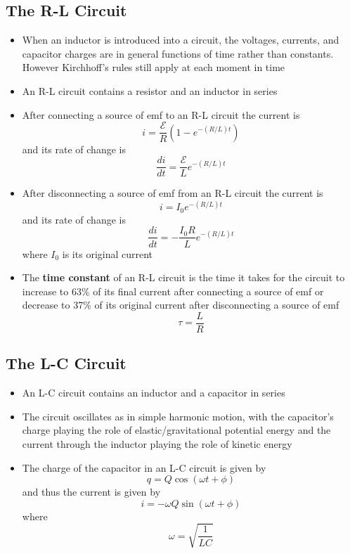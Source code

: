 \documentclass{article}
\begin{document}
\subsection{The R-L Circuit}

\begin{itemize}
  \item When an inductor is introduced into a circuit, the voltages, currents, and capacitor charges are in general functions of time rather than constants. However Kirchhoff's rules still apply at each moment in time

  \item An R-L circuit contains a resistor and an inductor in series

  \item After connecting a source of emf to an R-L circuit the current is \[i = \frac{\mathcal{E}}{R} (1 - e^{-(R / L) t})\] and its rate of change is \[\frac{di}{dt} = \frac{\mathcal{E}}{L} e^{-(R / L) t}\]

  \item After disconnecting a source of emf from an R-L circuit the current is \[i = I_0 e^{-(R / L) t}\] and its rate of change is \[\frac{di}{dt} = -\frac{I_0 R}{L} e^{-(R / L) t}\] where $I_0$ is its original current

  \item The \textbf{time constant} of an R-L circuit is the time it takes for the circuit to increase to 63\% of its final current after connecting a source of emf or decrease to 37\% of its original current after disconnecting a source of emf \[\tau = \frac{L}{R}\]
\end{itemize}

\subsection{The L-C Circuit}

\begin{itemize}
  \item An L-C circuit contains an inductor and a capacitor in series

  \item The circuit oscillates as in simple harmonic motion, with the capacitor's charge playing the role of elastic/gravitational potential energy and the current through the inductor playing the role of kinetic energy

\item The charge of the capacitor in an L-C circuit is given by \[q = Q \cos ( \omega t + \phi )\] and thus the current is given by \[i = -\omega Q \sin ( \omega t + \phi )\] where \[\omega = \sqrt{\frac{1}{L C}}\]
\end{itemize}
\end{document}
